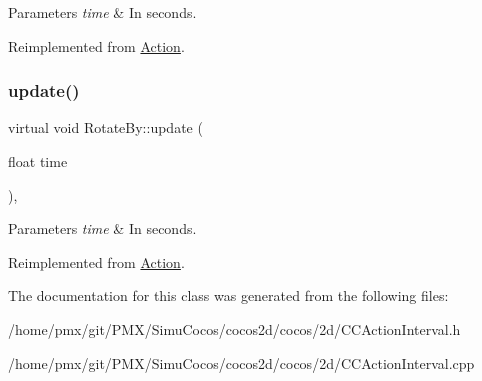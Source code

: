 \begin{DoxyParams}{Parameters}
{\em time} & In seconds. \\
\hline
\end{DoxyParams}


Reimplemented from \hyperlink{classAction_a937e646e63915e33ad05ba149bfcf239}{Action}.

\mbox{\label{classRotateBy_ac0a29a18c0232c7502b8bd53ac5de399}} 
\subsubsection{\texorpdfstring{update()}{update()}\hspace{0.1cm}{\footnotesize\ttfamily [2/2]}}
{\footnotesize\ttfamily virtual void Rotate\+By\+::update (\begin{DoxyParamCaption}\item[{float}]{time }\end{DoxyParamCaption})\hspace{0.3cm}{\ttfamily [override]}, {\ttfamily [virtual]}}


\begin{DoxyParams}{Parameters}
{\em time} & In seconds. \\
\hline
\end{DoxyParams}


Reimplemented from \hyperlink{classAction_a937e646e63915e33ad05ba149bfcf239}{Action}.



The documentation for this class was generated from the following files\+:\begin{DoxyCompactItemize}
\item 
/home/pmx/git/\+P\+M\+X/\+Simu\+Cocos/cocos2d/cocos/2d/C\+C\+Action\+Interval.\+h\item 
/home/pmx/git/\+P\+M\+X/\+Simu\+Cocos/cocos2d/cocos/2d/C\+C\+Action\+Interval.\+cpp\end{DoxyCompactItemize}
